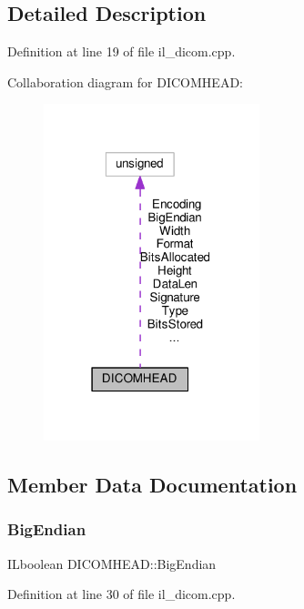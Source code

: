 \subsection{Detailed Description}


Definition at line 19 of file il\+\_\+dicom.\+cpp.



Collaboration diagram for D\+I\+C\+O\+M\+H\+E\+AD\+:
\nopagebreak
\begin{figure}[H]
\begin{center}
\leavevmode
\includegraphics[width=178pt]{de/d4f/structDICOMHEAD__coll__graph}
\end{center}
\end{figure}


\subsection{Member Data Documentation}
\mbox{\label{structDICOMHEAD_ad705dab9fd5b9c2d8f5465678ab668bc}} 
\subsubsection{\texorpdfstring{Big\+Endian}{BigEndian}}
{\footnotesize\ttfamily I\+Lboolean D\+I\+C\+O\+M\+H\+E\+A\+D\+::\+Big\+Endian}



Definition at line 30 of file il\+\_\+dicom.\+cpp.

